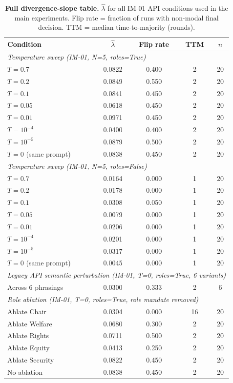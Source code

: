 \documentclass[11pt,onecolumn]{article}
\newcommand{\lam}{\ensuremath{\hat{\lambda}}}
\begin{document}
\begin{table}[H]
\caption{\textbf{Full divergence-slope table.}
  $\lam$ for all IM-01 API conditions used in the main experiments.
  Flip rate = fraction of runs with non-modal final decision.
  TTM = median time-to-majority (rounds).}
\label{tab:lambda-full}
\small
\begin{tabular}{@{}lcccc@{}}
\toprule
\textbf{Condition} & $\lam$ & \textbf{Flip rate} & \textbf{TTM} & $n$ \\
\midrule
\multicolumn{5}{l}{\textit{Temperature sweep (IM-01, N=5, roles=True)}} \\
$T = 0.7$         & 0.0822 & 0.400 & 2 & 20 \\
$T = 0.2$         & 0.0849 & 0.550 & 2 & 20 \\
$T = 0.1$         & 0.0841 & 0.450 & 2 & 20 \\
$T = 0.05$        & 0.0618 & 0.450 & 2 & 20 \\
$T = 0.01$        & 0.0971 & 0.450 & 2 & 20 \\
$T = 10^{-4}$     & 0.0400 & 0.400 & 2 & 20 \\
$T = 10^{-5}$     & 0.0879 & 0.500 & 2 & 20 \\
$T = 0$ (same prompt) & 0.0838 & 0.450 & 2 & 20 \\
\midrule
\multicolumn{5}{l}{\textit{Temperature sweep (IM-01, N=5, roles=False)}} \\
$T = 0.7$         & 0.0164 & 0.000 & 1 & 20 \\
$T = 0.2$         & 0.0178 & 0.000 & 1 & 20 \\
$T = 0.1$         & 0.0308 & 0.050 & 1 & 20 \\
$T = 0.05$        & 0.0079 & 0.000 & 1 & 20 \\
$T = 0.01$        & 0.0206 & 0.000 & 1 & 20 \\
$T = 10^{-4}$     & 0.0201 & 0.000 & 1 & 20 \\
$T = 10^{-5}$     & 0.0317 & 0.000 & 1 & 20 \\
$T = 0$ (same prompt) & 0.0045 & 0.000 & 1 & 20 \\
\midrule
\multicolumn{5}{l}{\textit{Legacy API semantic perturbation (IM-01, T=0, roles=True, 6 variants)}} \\
Across 6 phrasings & 0.0300 & 0.333 & 2 & 6 \\
\midrule
\multicolumn{5}{l}{\textit{Role ablation (IM-01, T=0, roles=True, role mandate removed)}} \\
Ablate Chair    & 0.0304 & 0.000 & 16 & 20 \\
Ablate Welfare  & 0.0680 & 0.300 & 2  & 20 \\
Ablate Rights   & 0.0711 & 0.500 & 2  & 20 \\
Ablate Equity   & 0.0413 & 0.250 & 2  & 20 \\
Ablate Security & 0.0822 & 0.450 & 2  & 20 \\
No ablation     & 0.0838 & 0.450 & 2  & 20 \\
\bottomrule
\end{tabular}
\end{table}
\end{document}
